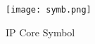 \begin{figure}[!htbp]
    \centerline{\texttt{[image: symb.png]}}
    \vspace{0cm}\caption{IP Core Symbol}
    \label{fig:i2score_sym}
\end{figure}

